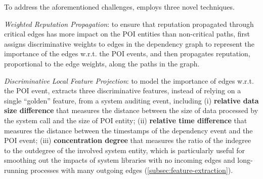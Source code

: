 

To address the aforementioned challenges, \tool employs three novel techniques.


\emph{Weighted Reputation Propagation}: to ensure that reputation propagated through critical edges has more impact on the POI entities than non-critical paths, \tool first assigns discriminative weights to edges in the dependency graph to represent the importance of the edges w.r.t. the POI events, and then propagates reputation, proportional to the edge weights, along the paths in the graph.

%
\emph{Discriminative Local Feature Projection}: to model the importance of edges w.r.t. the POI event, \tool extracts three 
discriminative features, instead of relying on a single ``golden'' feature, from a system auditing event, including 
(i) \textbf{relative data size difference} that measures the distance between the size of data processed by the system call and the size of POI entity;
(ii) \textbf{relative time difference} that measures the distance between the timestamps of the dependency event and the POI event;
(iii) \textbf{concentration degree} that measures the ratio of the indegree to the outdegree of the involved 
system entity, which is particularly useful for smoothing out the impacts of system libraries with no incoming edges and long-running processes with many outgoing edges
(\cref{subsec:feature-extraction}).

